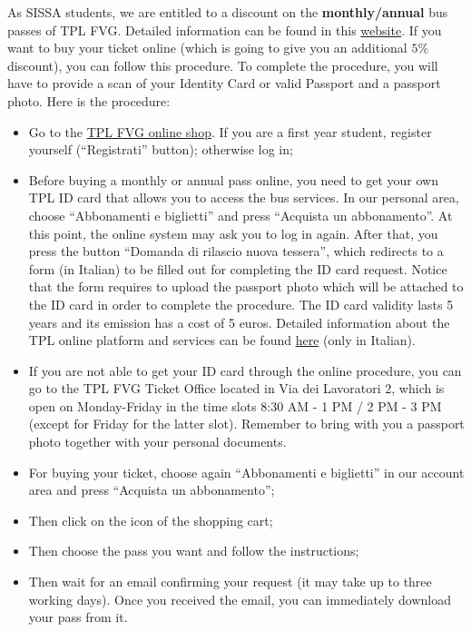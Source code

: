 \documentclass{sissavademecum}
\begin{document}
As SISSA students, we are entitled to a discount on the \textbf{monthly/annual} bus passes of TPL FVG. Detailed information can be found in this \href{http://ardiss.fvg.it/contenuti.php?view=page&id=41#scheda67}{website}. If you want to buy your ticket online (which is going to give you an additional $5$\% discount), you can follow this procedure. To complete the procedure, you will have to provide a scan of your Identity Card or valid Passport and a passport photo. Here is the procedure:
\begin{itemize}
    \item Go to the \href{https://tplfvg.it/it/passenger/}{TPL FVG online shop}. If you are a first year student, register yourself (``Registrati'' button); otherwise log in;
    \item Before buying a monthly or annual pass online, you need to get your own TPL ID card that allows you to access the bus services. In our personal area, choose ``Abbonamenti e biglietti'' and press ``Acquista un abbonamento''. At this point, the online system may ask you to log in again. After that, you press the button ``Domanda di rilascio nuova tessera'', which redirects to a form (in Italian) to be filled out for completing the ID card request. Notice that the form requires to upload the passport photo which will be attached to the ID card in order to complete the procedure. The ID card validity lasts 5 years and its emission has a cost of 5 euros. Detailed information about the TPL online platform and services
    can be found \href{https://webticketing.triestetrasporti.it/Documenti/Istruzioni.pdf}{here} (only in Italian).
    \item If you are not able to get your ID card through the online procedure, you can go to the TPL FVG Ticket Office located in Via dei Lavoratori 2, which is open on Monday-Friday in the time slots 8:30 AM - 1 PM / 2 PM - 3 PM (except for Friday for the latter slot). Remember to bring with you a passport photo together with your personal documents.
    \item For buying your ticket, choose again ``Abbonamenti e biglietti'' in our account area and press ``Acquista un abbonamento'';
    \item Then click on the icon of the shopping cart;
    \item Then choose the pass you want and follow the instructions;
    \item Then wait for an email confirming your request (it may take up to three working days). Once you received the email, you can immediately download your pass from it.
\end{itemize}
\end{document}
